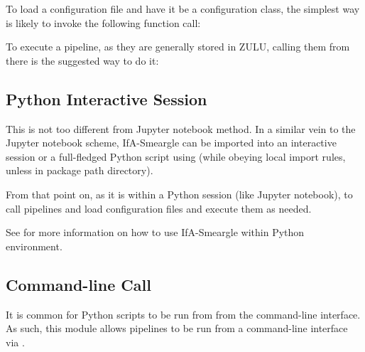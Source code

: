 \documentclass[letterpaper,10pt,english]{sphinxmanual}
\begin{document}
To load a configuration file and have it be a configuration class, the simplest
way is likely to invoke the following function call:

\begin{sphinxVerbatim}[commandchars=\\\{\}]
  
\end{sphinxVerbatim}

To execute a pipeline, as they are generally stored in ZULU, calling them
from there is the suggested way to do it:

\begin{sphinxVerbatim}[commandchars=\\\{\}]
   
\end{sphinxVerbatim}


\subsection{Python Interactive Session}
\label{\detokenize{quickstart:python-interactive-session}}
This is not too different from Jupyter notebook method. In a similar vein to
the Jupyter notebook scheme, IfA-Smeargle can be imported into an interactive
session or a full-fledged Python script using 
(while obeying local import rules, unless in package path directory).

From that point on, as it is within a Python session (like Jupyter notebook),
to call pipelines and load configuration files and execute them as needed.

See {\hyperref[\detokenize{quickstart:jupyter-notebook}]{}} for more information on how to use IfA-Smeargle within
Python environment.


\subsection{Command-line Call}
\label{\detokenize{quickstart:command-line-call}}
It is common for Python scripts to be run from from the command-line interface.
As such, this module allows pipelines to be run from a command-line interface
via .
\end{document}
